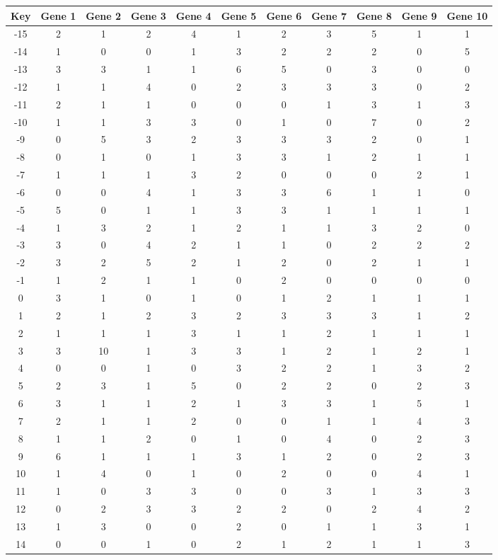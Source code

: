 \begin{tabular}{|c|c|c|c|c|c|c|c|c|c|c|}
\hline
Key & Gene 1 & Gene 2 & Gene 3 & Gene 4 & Gene 5 & Gene 6 & Gene 7 & Gene 8 & Gene 9 & Gene 10 \\
\hline
-15 & 2 & 1 & 2 & 4 & 1 & 2 & 3 & 5 & 1 & 1 \\
-14 & 1 & 0 & 0 & 1 & 3 & 2 & 2 & 2 & 0 & 5 \\
-13 & 3 & 3 & 1 & 1 & 6 & 5 & 0 & 3 & 0 & 0 \\
-12 & 1 & 1 & 4 & 0 & 2 & 3 & 3 & 3 & 0 & 2 \\
-11 & 2 & 1 & 1 & 0 & 0 & 0 & 1 & 3 & 1 & 3 \\
-10 & 1 & 1 & 3 & 3 & 0 & 1 & 0 & 7 & 0 & 2 \\
-9 & 0 & 5 & 3 & 2 & 3 & 3 & 3 & 2 & 0 & 1 \\
-8 & 0 & 1 & 0 & 1 & 3 & 3 & 1 & 2 & 1 & 1 \\
-7 & 1 & 1 & 1 & 3 & 2 & 0 & 0 & 0 & 2 & 1 \\
-6 & 0 & 0 & 4 & 1 & 3 & 3 & 6 & 1 & 1 & 0 \\
-5 & 5 & 0 & 1 & 1 & 3 & 3 & 1 & 1 & 1 & 1 \\
-4 & 1 & 3 & 2 & 1 & 2 & 1 & 1 & 3 & 2 & 0 \\
-3 & 3 & 0 & 4 & 2 & 1 & 1 & 0 & 2 & 2 & 2 \\
-2 & 3 & 2 & 5 & 2 & 1 & 2 & 0 & 2 & 1 & 1 \\
-1 & 1 & 2 & 1 & 1 & 0 & 2 & 0 & 0 & 0 & 0 \\
0 & 3 & 1 & 0 & 1 & 0 & 1 & 2 & 1 & 1 & 1 \\
1 & 2 & 1 & 2 & 3 & 2 & 3 & 3 & 3 & 1 & 2 \\
2 & 1 & 1 & 1 & 3 & 1 & 1 & 2 & 1 & 1 & 1 \\
3 & 3 & 10 & 1 & 3 & 3 & 1 & 2 & 1 & 2 & 1 \\
4 & 0 & 0 & 1 & 0 & 3 & 2 & 2 & 1 & 3 & 2 \\
5 & 2 & 3 & 1 & 5 & 0 & 2 & 2 & 0 & 2 & 3 \\
6 & 3 & 1 & 1 & 2 & 1 & 3 & 3 & 1 & 5 & 1 \\
7 & 2 & 1 & 1 & 2 & 0 & 0 & 1 & 1 & 4 & 3 \\
8 & 1 & 1 & 2 & 0 & 1 & 0 & 4 & 0 & 2 & 3 \\
9 & 6 & 1 & 1 & 1 & 3 & 1 & 2 & 0 & 2 & 3 \\
10 & 1 & 4 & 0 & 1 & 0 & 2 & 0 & 0 & 4 & 1 \\
11 & 1 & 0 & 3 & 3 & 0 & 0 & 3 & 1 & 3 & 3 \\
12 & 0 & 2 & 3 & 3 & 2 & 2 & 0 & 2 & 4 & 2 \\
13 & 1 & 3 & 0 & 0 & 2 & 0 & 1 & 1 & 3 & 1 \\
14 & 0 & 0 & 1 & 0 & 2 & 1 & 2 & 1 & 1 & 3 \\
\hline
\end{tabular}